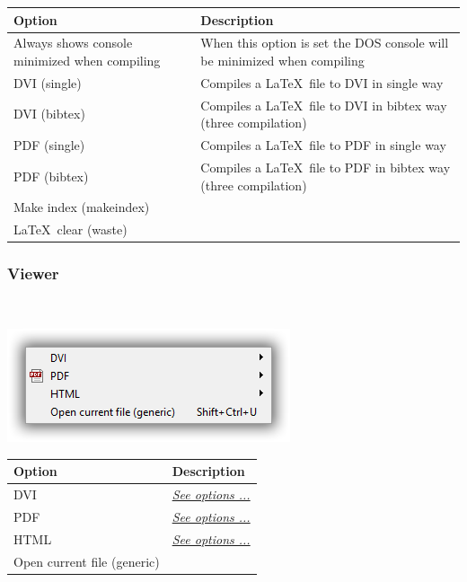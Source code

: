 \begin{scriptsize}
  \begin{tabularx}{\textwidth}{>{\hsize=0.5\hsize}X>{\hsize=0.7\hsize}X}\\
    \hline
    \textbf{Option} & \textbf{Description} \\
    \hline
    Always shows console minimized when compiling & When this option is set the DOS console will be minimized when compiling \\
    DVI (single) & Compiles a \LaTeX ~file to DVI in single way \\
    DVI (bibtex) & Compiles a \LaTeX ~file to DVI in bibtex way (three compilation) \\
    PDF (single) & Compiles a \LaTeX ~file to PDF in single way \\
    PDF (bibtex) & Compiles a \LaTeX ~file to PDF in bibtex way (three compilation) \\
    Make index (makeindex) \\
    \LaTeX ~clear (waste) \\
    \hline
  \end{tabularx}
\end{scriptsize}


\hypertarget{menu_tools_processing_viewer}{}
\subsubsection{Viewer}\\

\includegraphics[scale=0.50]{./res/menu_tools_processing_viewer.png}\\

\begin{scriptsize}
  \begin{tabularx}{\textwidth}{>{\hsize=0.3\hsize}X>{\hsize=0.7\hsize}X}\\
    \hline
    \textbf{Option} & \textbf{Description} \\
    \hline
    DVI  & \textit{\href{\#menu\_tools\_processing\_viewer\_DVI}{See options ...}} \\
    PDF  & \textit{\href{\#menu\_tools\_processing\_viewer\_pdf}{See options ...}} \\
    HTML & \textit{\href{\#menu\_tools\_processing\_viewer\_html}{See options ...}} \\
    Open current file (generic) \\
    \hline
  \end{tabularx}
\end{scriptsize}


